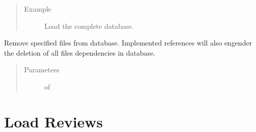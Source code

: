 \documentclass[letterpaper,10pt,english]{sphinxmanual}
\begin{document}
\begin{fulllineitems}
\begin{quote}
\begin{description}
\item[{Example}] \leavevmode
Load the complete database.

%
\begin{sphinxVerbatim}[commandchars=\\\{\}]
   
  
\end{sphinxVerbatim}

\end{description}\end{quote}

\end{fulllineitems}


\begin{fulllineitems}
\label{\detokenize{index:loacore.load.file_load.remove_files}}
Remove specified files from database. Implemented references will also engender the deletion of all files
dependencies in database.
\begin{quote}\begin{description}
\item[{Parameters}] \leavevmode
{} \textendash{}  of 

\end{description}\end{quote}

\end{fulllineitems}



\section{Load Reviews}
\label{\detokenize{index:module-loacore.load.review_load}}\label{\detokenize{index:load-reviews}}
\end{document}

